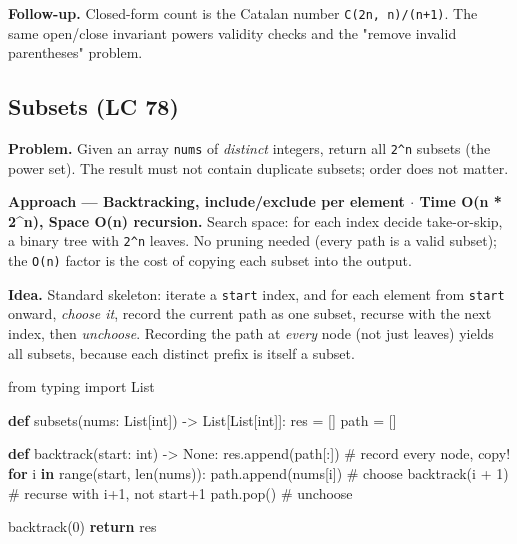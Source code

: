 \documentclass[11pt]{article}
\newenvironment{Shaded}{\begin{snugshade}}{\end{snugshade}}
\newcommand{\BuiltInTok}[1]{\textcolor[rgb]{0.50,0.55,0.55}{#1}}
\newcommand{\CommentTok}[1]{\textcolor[rgb]{0.48,0.49,0.49}{#1}}
\newcommand{\ControlFlowTok}[1]{\textcolor[rgb]{0.99,0.74,0.29}{\textbf{#1}}}
\newcommand{\DecValTok}[1]{\textcolor[rgb]{0.96,0.45,0.00}{#1}}
\newcommand{\ImportTok}[1]{\textcolor[rgb]{0.15,0.68,0.38}{#1}}
\newcommand{\KeywordTok}[1]{\textcolor[rgb]{0.81,0.81,0.76}{\textbf{#1}}}
\newcommand{\NormalTok}[1]{\textcolor[rgb]{0.81,0.81,0.76}{#1}}
\newcommand{\OperatorTok}[1]{\textcolor[rgb]{0.81,0.81,0.76}{#1}}
\newcommand{\VariableTok}[1]{\textcolor[rgb]{0.15,0.68,0.68}{#1}}
\begin{document}
\textbf{Follow-up.} Closed-form count is the Catalan number \texttt{C(2n,\ n)/(n+1)}. The same open/close invariant powers validity checks and the "remove invalid parentheses" problem.

\subsection{Subsets (LC 78)}\label{subsets-lc-78}

\textbf{Problem.} Given an array \texttt{nums} of \emph{distinct} integers, return all \texttt{2\^{}n} subsets (the power set). The result must not contain duplicate subsets; order does not matter.

\textbf{Approach --- Backtracking, include/exclude per element \(\cdot\) Time O(n * 2\^{}n), Space O(n) recursion.} Search space: for each index decide take-or-skip, a binary tree with \texttt{2\^{}n} leaves. No pruning needed (every path is a valid subset); the \texttt{O(n)} factor is the cost of copying each subset into the output.

\textbf{Idea.} Standard skeleton: iterate a \texttt{start} index, and for each element from \texttt{start} onward, \emph{choose it}, record the current path as one subset, recurse with the next index, then \emph{unchoose}. Recording the path at \emph{every} node (not just leaves) yields all subsets, because each distinct prefix is itself a subset.


\begin{Shaded}
\begin{Highlighting}[]
\ImportTok{from}\NormalTok{ typing }\ImportTok{import}\NormalTok{ List}

\KeywordTok{def}\NormalTok{ subsets(nums: List[}\BuiltInTok{int}\NormalTok{]) }\OperatorTok{{-}\textgreater{}}\NormalTok{ List[List[}\BuiltInTok{int}\NormalTok{]]:}
\NormalTok{    res }\OperatorTok{=}\NormalTok{ []}
\NormalTok{    path }\OperatorTok{=}\NormalTok{ []}

    \KeywordTok{def}\NormalTok{ backtrack(start: }\BuiltInTok{int}\NormalTok{) }\OperatorTok{{-}\textgreater{}} \VariableTok{None}\NormalTok{:}
\NormalTok{        res.append(path[:])                  }\CommentTok{\# record every node, copy!}
        \ControlFlowTok{for}\NormalTok{ i }\KeywordTok{in} \BuiltInTok{range}\NormalTok{(start, }\BuiltInTok{len}\NormalTok{(nums)):}
\NormalTok{            path.append(nums[i])             }\CommentTok{\# choose}
\NormalTok{            backtrack(i }\OperatorTok{+} \DecValTok{1}\NormalTok{)                 }\CommentTok{\# recurse with i+1, not start+1}
\NormalTok{            path.pop()                       }\CommentTok{\# unchoose}

\NormalTok{    backtrack(}\DecValTok{0}\NormalTok{)}
    \ControlFlowTok{return}\NormalTok{ res}
\end{Highlighting}
\end{Shaded}
\end{document}
